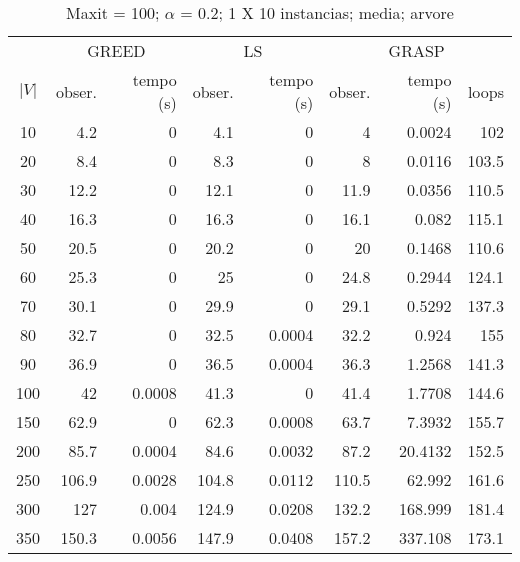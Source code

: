 \documentclass[]{article}
\begin{document}
\begin {table}[h]
\centering
\caption{Maxit = 100; $\alpha$ = 0.2; 1 X 10 instancias; media; arvore}
\begin{small}
	\begin{tabular}{|c|r|r|r|r|r|r|r|}
		\hline
		& \multicolumn{2}{c|}{GREED} & \multicolumn{2}{c|}{LS} & \multicolumn{3}{c|}{GRASP} \\ 
		\cline{2-8}
		$|V|$   &  obser. & tempo (s)  & obser. & tempo (s) & obser. & tempo (s) & loops\\ 
		\hline
		10 & 4.2 & 0 & 4.1 & 0 & 4 & 0.0024 & 102 \\ 
		20 & 8.4 & 0 & 8.3 & 0 & 8 & 0.0116 & 103.5 \\ 
		30 & 12.2 & 0 & 12.1 & 0 & 11.9 & 0.0356 & 110.5 \\ 
		40 & 16.3 & 0 & 16.3 & 0 & 16.1 & 0.082 & 115.1 \\ 
		50 & 20.5 & 0 & 20.2 & 0 & 20 & 0.1468 & 110.6 \\ 
		60 & 25.3 & 0 & 25 & 0 & 24.8 & 0.2944 & 124.1 \\ 
		70 & 30.1 & 0 & 29.9 & 0 & 29.1 & 0.5292 & 137.3 \\ 
		80 & 32.7 & 0 & 32.5 & 0.0004 & 32.2 & 0.924 & 155 \\ 
		90 & 36.9 & 0 & 36.5 & 0.0004 & 36.3 & 1.2568 & 141.3 \\ 
		100 & 42 & 0.0008 & 41.3 & 0 & 41.4 & 1.7708 & 144.6 \\ 
		150 & 62.9 & 0 & 62.3 & 0.0008 & 63.7 & 7.3932 & 155.7 \\ 
		200 & 85.7 & 0.0004 & 84.6 & 0.0032 & 87.2 & 20.4132 & 152.5 \\ 
		250 & 106.9 & 0.0028 & 104.8 & 0.0112 & 110.5 & 62.992 & 161.6 \\ 
		300 & 127 & 0.004 & 124.9 & 0.0208 & 132.2 & 168.999 & 181.4 \\ 
		350 & 150.3 & 0.0056 & 147.9 & 0.0408 & 157.2 & 337.108 & 173.1 \\ 
		\hline
	\end{tabular} \label{}
\end{small}
\end{table}
\end{document}
